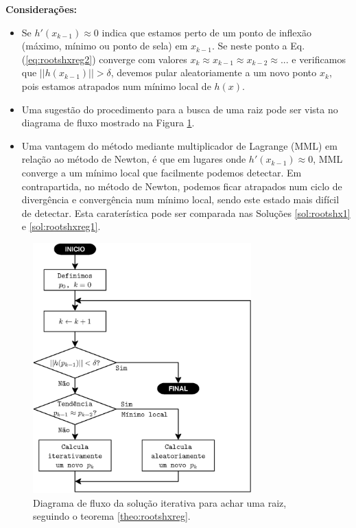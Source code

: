 \begin{theorem}
\textbf{Considerações:}
\begin{itemize} 
\item Se $h'(x_{k-1})\approx 0$ indica que estamos perto de um ponto de inflexão 
(máximo, mínimo ou ponto de sela) em $x_{k-1}$. Se neste ponto a Eq. (\ref{eq:rootshxreg2})
converge com valores $x_k\approx x_{k-1}\approx x_{k-2}\approx ...$ e verificamos que $||h(x_{k-1})||>\delta$,
devemos pular aleatoriamente a um novo ponto $x_k$, pois estamos atrapados num mínimo local de $h(x)$.  
\item Uma sugestão do procedimento para a busca de uma raiz pode ser vista no diagrama de fluxo
mostrado na Figura \ref{fig:fluxorhxreg3}. 
\end{itemize}
\end{theorem}

\begin{tcbattention}
\begin{itemize}
\item Uma vantagem do método mediante multiplicador de Lagrange (MML) em relação ao método de Newton,
é que em lugares onde $h'(x_{k-1})\approx 0$, MML converge a um mínimo local 
que facilmente podemos detectar. Em contrapartida,
no método de Newton, podemos ficar atrapados num ciclo de divergência e convergência num mínimo local, 
sendo este estado mais difícil de detectar.
Esta caraterística pode ser comparada nas Soluções \ref{sol:rootshx1} e \ref{sol:rootshxreg1}.
\end{itemize}
\end{tcbattention}

\begin{figure}[!h]
     \centering
         \includegraphics[width=0.75\textwidth]{chapters/roots/fluxo3.eps}
        \caption{Diagrama de fluxo da solução iterativa para achar uma raiz, seguindo o teorema \ref{theo:rootshxreg}.}
        \label{fig:fluxorhxreg3}
\end{figure}

